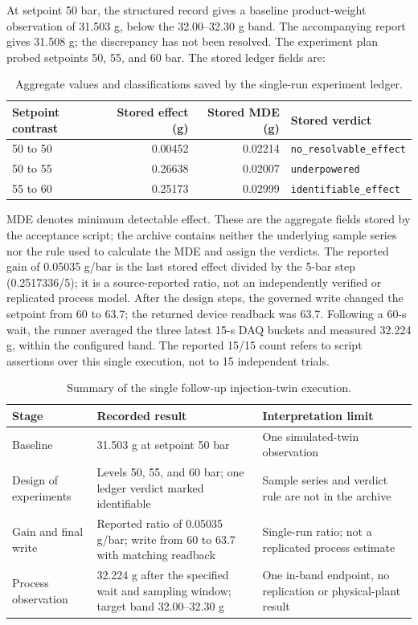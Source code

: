 \documentclass[10pt]{article}
\begin{document}
At setpoint 50 bar, the structured record gives a baseline product-weight
observation of 31.503 g, below the 32.00--32.30 g band. The accompanying
report gives 31.508 g; the discrepancy has not been resolved. The experiment plan probed setpoints 50, 55,
and 60 bar.
The stored ledger fields are:

\begin{table}[htbp]
\centering
\caption{Aggregate values and classifications saved by the single-run experiment ledger.}
\footnotesize
\begin{tabular}{@{}l r r l@{}}
\toprule
Setpoint contrast & Stored effect (g) & Stored MDE (g) & Stored verdict \\
\midrule
50 to 50 & 0.00452 & 0.02214 & \texttt{no\_resolvable\_effect} \\
50 to 55 & 0.26638 & 0.02007 & \texttt{underpowered} \\
55 to 60 & 0.25173 & 0.02999 & \texttt{identifiable\_effect} \\
\bottomrule
\end{tabular}
\end{table}

MDE denotes minimum detectable effect. These are the aggregate fields stored
by the acceptance script; the archive contains neither the underlying sample
series nor the rule used to calculate the MDE and assign the verdicts. The
reported gain of 0.05035 g/bar is the last stored effect divided by the
5-bar step (0.2517336/5); it is a source-reported ratio, not an independently
verified or replicated process model. After the design steps,
the governed write changed the setpoint from 60 to 63.7; the returned device
readback was 63.7. Following a 60-s wait, the runner averaged the three latest
15-s DAQ buckets and measured 32.224 g, within the configured band. The
reported 15/15 count refers to script assertions over this single execution,
not to 15 independent trials.

\begin{table}[htbp]
\centering
\caption{Summary of the single follow-up injection-twin execution.}
\footnotesize
\setlength{\tabcolsep}{4pt}
\begin{tabularx}{\textwidth}{@{}p{3.3cm}X p{4.8cm}@{}}
\toprule
Stage & Recorded result & Interpretation limit \\
\midrule
Baseline & 31.503 g at setpoint 50 bar & One simulated-twin observation \\
Design of experiments & Levels 50, 55, and 60 bar; one ledger verdict marked identifiable & Sample series and verdict rule are not in the archive \\
Gain and final write & Reported ratio of 0.05035 g/bar; write from 60 to 63.7 with matching readback & Single-run ratio; not a replicated process estimate \\
Process observation & 32.224 g after the specified wait and sampling window; target band 32.00--32.30 g & One in-band endpoint, no replication or physical-plant result \\
\bottomrule
\end{tabularx}
\end{table}
\end{document}
